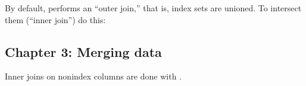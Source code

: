 \documentclass[letterpaper,10pt,english]{sphinxmanual}
\begin{document}
By default,  performs an “outer join,” that is, index sets are unioned.  To intersect them (“inner join”) do this:

\begin{sphinxVerbatim}[commandchars=\\\{\}]
   \PYG{p}{[}   \PYG{p}{]} 
                     
     
\end{sphinxVerbatim}


\subsection{Chapter 3: Merging data}
\label{\detokenize{big-cheat-sheet:chapter-3-merging-data}}
Inner joins on non\sphinxhyphen{}index columns are done with .
\end{document}
